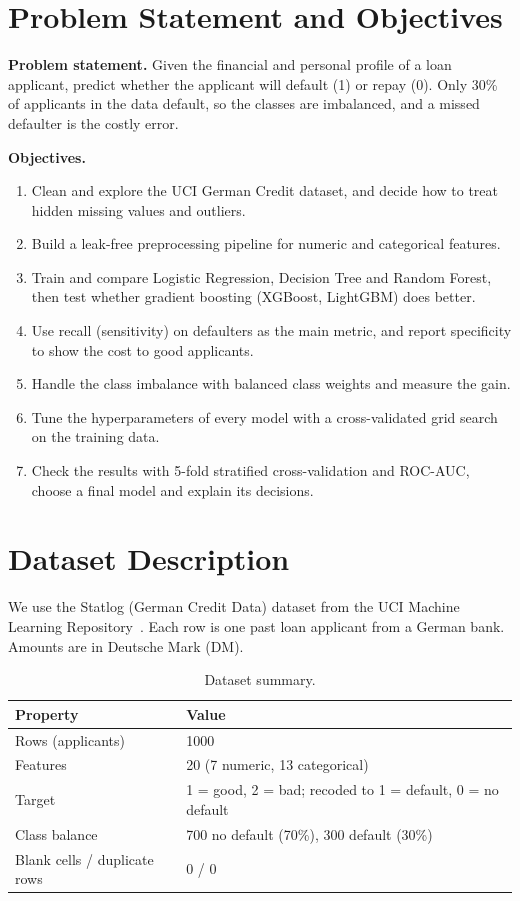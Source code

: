 \documentclass[11pt,a4paper]{article}
\begin{document}
\section{Problem Statement and Objectives}

\textbf{Problem statement.} Given the financial and personal profile of a loan applicant, predict whether the applicant will default (1) or repay (0). Only 30\% of applicants in the data default, so the classes are imbalanced, and a missed defaulter is the costly error.

\textbf{Objectives.}
\begin{enumerate}
  \item Clean and explore the UCI German Credit dataset, and decide how to treat hidden missing values and outliers.
  \item Build a leak-free preprocessing pipeline for numeric and categorical features.
  \item Train and compare Logistic Regression, Decision Tree and Random Forest, then test whether gradient boosting (XGBoost, LightGBM) does better.
  \item Use recall (sensitivity) on defaulters as the main metric, and report specificity to show the cost to good applicants.
  \item Handle the class imbalance with balanced class weights and measure the gain.
  \item Tune the hyperparameters of every model with a cross-validated grid search on the training data.
  \item Check the results with 5-fold stratified cross-validation and ROC-AUC, choose a final model and explain its decisions.
\end{enumerate}

\section{Dataset Description}

We use the Statlog (German Credit Data) dataset from the UCI Machine Learning Repository~\cite{uci}. Each row is one past loan applicant from a German bank. Amounts are in Deutsche Mark (DM).

\begin{table}[H]
\centering
\caption{Dataset summary.}
\begin{tabular}{ll}
\toprule
Property & Value \\
\midrule
Rows (applicants) & 1000 \\
Features & 20 (7 numeric, 13 categorical) \\
Target & 1 = good, 2 = bad; recoded to 1 = default, 0 = no default \\
Class balance & 700 no default (70\%), 300 default (30\%) \\
Blank cells / duplicate rows & 0 / 0 \\
\bottomrule
\end{tabular}
\end{table}
\end{document}
